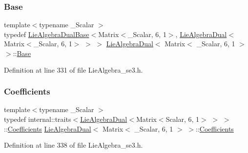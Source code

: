 \subsubsection{\texorpdfstring{Base}{Base}}
{\footnotesize\ttfamily template$<$typename \+\_\+\+Scalar $>$ \\
typedef \hyperlink{class_lie_algebra_dual_base}{Lie\+Algebra\+Dual\+Base}$<$Matrix$<$\+\_\+\+Scalar, 6, 1$>$, \hyperlink{class_lie_algebra_dual}{Lie\+Algebra\+Dual}$<$Matrix$<$\+\_\+\+Scalar, 6, 1$>$ $>$ $>$ \hyperlink{class_lie_algebra_dual}{Lie\+Algebra\+Dual}$<$ Matrix$<$ \+\_\+\+Scalar, 6, 1 $>$ $>$\+::\hyperlink{class_lie_algebra_dual_3_01_matrix_3_01___scalar_00_016_00_011_01_4_01_4_a45aa12118237d9a3de26fc61791f31bf}{Base}\hspace{0.3cm}{\ttfamily [protected]}}



Definition at line 331 of file Lie\+Algebra\+\_\+se3.\+h.

\hypertarget{class_lie_algebra_dual_3_01_matrix_3_01___scalar_00_016_00_011_01_4_01_4_ae22cd667e4ac77db27cc018db14003bd}{}\label{class_lie_algebra_dual_3_01_matrix_3_01___scalar_00_016_00_011_01_4_01_4_ae22cd667e4ac77db27cc018db14003bd} 
\subsubsection{\texorpdfstring{Coefficients}{Coefficients}}
{\footnotesize\ttfamily template$<$typename \+\_\+\+Scalar $>$ \\
typedef internal\+::traits$<$\hyperlink{class_lie_algebra_dual}{Lie\+Algebra\+Dual}$<$Matrix$<$Scalar, 6, 1$>$ $>$ $>$\+::\hyperlink{class_lie_algebra_dual_3_01_matrix_3_01___scalar_00_016_00_011_01_4_01_4_ae22cd667e4ac77db27cc018db14003bd}{Coefficients} \hyperlink{class_lie_algebra_dual}{Lie\+Algebra\+Dual}$<$ Matrix$<$ \+\_\+\+Scalar, 6, 1 $>$ $>$\+::\hyperlink{class_lie_algebra_dual_3_01_matrix_3_01___scalar_00_016_00_011_01_4_01_4_ae22cd667e4ac77db27cc018db14003bd}{Coefficients}}



Definition at line 338 of file Lie\+Algebra\+\_\+se3.\+h.



